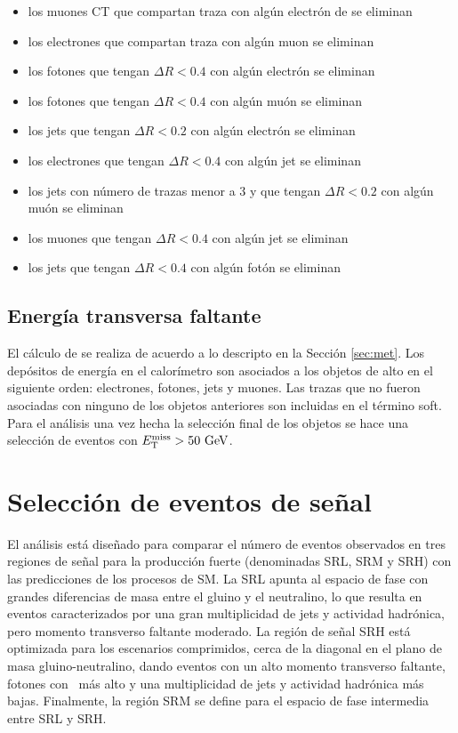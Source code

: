 \begin{itemize}
  \item los muones CT que compartan traza con algún electrón de se eliminan
  \item los electrones que compartan traza con algún muon se eliminan
  \item los fotones que tengan $\Delta R<0.4$ con algún electrón se eliminan
  \item los fotones que tengan $\Delta R<0.4$ con algún muón se eliminan
  \item los jets que tengan $\Delta R<0.2$ con algún electrón se eliminan
  \item los electrones que tengan $\Delta R<0.4$ con algún jet se eliminan
  \item los jets con número de trazas menor a 3 y que tengan $\Delta R<0.2$ con algún muón se eliminan
  \item los muones que tengan $\Delta R<0.4$ con algún jet se eliminan
  \item los jets que tengan $\Delta R<0.4$ con algún fotón se eliminan
\end{itemize}


\subsection{Energía transversa faltante}

El cálculo de \met se realiza de acuerdo a lo descripto en la Sección \ref{sec:met}. Los depósitos de energía en el calorímetro son asociados a los objetos de alto \pt en el siguiente orden: electrones, fotones, jets y muones. Las trazas que no fueron asociadas con ninguno de los objetos anteriores son incluidas en el término soft. Para el análisis una vez hecha la selección final de los objetos se hace una selección de eventos con $\met>50\ \gev$.


\section{Selección de eventos de señal}

El análisis está diseñado para comparar el número de eventos observados en tres regiones de señal para la producción fuerte (denominadas SRL, SRM y SRH) con las predicciones de los procesos de SM.
La SRL apunta al espacio de fase con grandes diferencias de masa entre el gluino y el neutralino, lo que resulta en eventos caracterizados por una gran multiplicidad de jets y actividad hadrónica, pero momento transverso faltante moderado. La región de señal SRH está optimizada para los escenarios comprimidos, cerca de la diagonal en el plano de masa gluino-neutralino, dando eventos con un alto momento transverso faltante, fotones con \pt\ más alto y una multiplicidad de jets y actividad hadrónica más bajas. Finalmente, la región SRM se define para el espacio de fase intermedia entre SRL y SRH.

